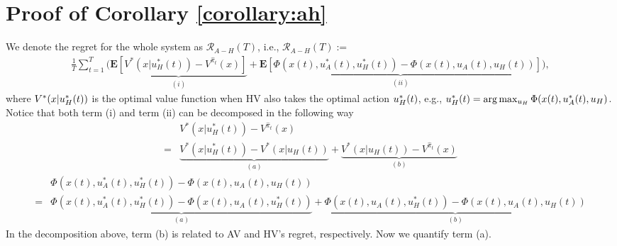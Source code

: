 \section{Proof of Corollary \ref{corollary:ah}} \label{app:coro}

We denote the regret  for the whole system as $\mathcal{R}_{A-H}(T)$, i.e., $\mathcal{R}_{A-H}(T):= $
\begin{align*}
    \frac{1}{T}\sum_{t=1}^T \bigg( \underbrace{ \mathbf{E} \left[V^{*}(x \vert u_H^{*}{(t)}) - V^{\hat{\pi}_t} (x)\right]}_{(i)} +  \underbrace{\mathbf{E} \left[ \Phi(x(t),u_A^{*}(t),u_H^{*}(t)) - \Phi(x(t),u_A(t),u_H(t)) \right]}_{(ii)} \bigg),
\end{align*}
where $V^{*}(x \vert u_H^{*}{\color{black}(t)})$ is the optimal value function when HV also takes the optimal action $u_H^{*}{\color{black}(t)}$, e.g., $u_H^{*}{\color{black}(t)}=\arg\max_{u_H} \Phi(x(t),u_A^{*}(t),u_H)$. Notice that both term (i) and term (ii) can be decomposed in the following way
\begin{align*}
  & V^{*}(x \vert u_H^{*}{(t)}) - V^{\hat{\pi}_t} (x) \\
    = & \underbrace{V^{*}(x \vert u_H^{*}{(t)}) - V^{*}(x \vert u_H{(t)})}_{(a)} + \underbrace{V^{*}(x \vert u_H{(t)}) - V^{\hat{\pi}_t} (x)}_{(b)}
\end{align*}
\begin{align*}
    &\Phi(x(t),u_A^{*}(t),u_H^{*}(t)) - \Phi(x(t),u_A(t),u_H(t)) \\
    =& \underbrace{\Phi(x(t),u_A^{*}(t),u_H^{*}(t)) - \Phi(x(t),u_A(t),u_H^{*}(t))}_{(a)} +\underbrace{\Phi(x(t),u_A(t),u_H^{*}(t)) - \Phi(x(t),u_A(t),u_H(t)) }_{(b)}
\end{align*}
In the decomposition above, term (b) is related to AV and HV's regret, respectively. Now we quantify term (a).

